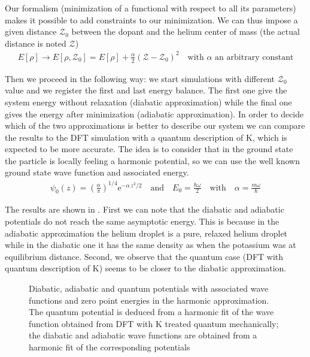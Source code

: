 Our formalism (minimization of a functional with respect to all its parameters) makes it possible to add constraints to our minimization.
We can thus impose a given distance $\mathcal{Z}_0$ between the dopant and the helium center of mass (the actual distance is noted $\mathcal{Z}$)
\begin{align}
E[\rho]\rightarrow E[\rho,\mathcal{Z}_0] = E[\rho] + \frac{\alpha}{2}(\mathcal{Z}-\mathcal{Z}_0)^2 \quad \text{with $\alpha$ an arbitrary constant}
\end{align}

Then we proceed in the following way: we start simulations with different $\mathcal{Z}_0$ value and we register the first and last energy balance. 
The first one give the system energy without relaxation (diabatic approximation) while the final one gives the energy after minimization (adiabatic approximation). In order to decide which of the two approximations is better to describe our system we can compare the results to the DFT simulation with a quantum description of K, which is expected to be more accurate. 
The idea is to consider that in the ground state the particle is locally feeling a harmonic potential, so we can use the well known ground state wave function and associated energy.
\begin{align}
\psi_0(z) = \left(\frac{\alpha}{\pi}\right)^{1/4} \mathrm{e}^{-\alpha \, z^2/2} \quad \text{and} \quad E_0 = \frac{\hbar\omega}{2} \quad \text{with} \quad \alpha = \frac{m\omega}{\hbar}
\label{eq:4S-oh}
\end{align}

The results are shown in .
First we can note that the diabatic and adiabatic potentials do not reach the same asymptotic energy.
This is because in the adiabatic approximation the helium droplet is a pure, relaxed helium droplet while in the diabatic one it has the same density as when the potassium was at equilibrium distance.
Second, we observe that the quantum case (DFT with quantum description of K) seems to be closer to the diabatic approximation. 

\begin{figure}[h]
\centering
    
    \vspace{-0.5\baselineskip}
    \caption{Diabatic, adiabatic and quantum potentials with associated wave functions and zero point energies in the harmonic approximation. The quantum potential is deduced from a harmonic fit of the wave function obtained from DFT with K treated quantum mechanically; the diabatic and adiabatic wave functions are obtained from a harmonic fit of the corresponding potentials}
    \label{fig:4S-potentials}
\end{figure}